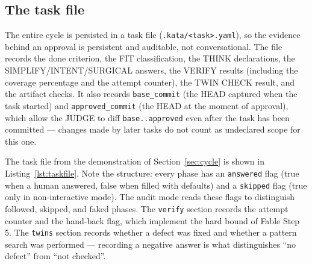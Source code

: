 \documentclass[11pt]{article}
\begin{document}
\subsection{The task file}

The entire cycle is persisted in a task file (\texttt{.kata/<task>.yaml}),
so the evidence behind an approval is persistent and auditable, not
conversational. The file records the done criterion, the FIT classification,
the THINK declarations, the SIMPLIFY/INTENT/SURGICAL answers, the VERIFY
results (including the coverage percentage and the attempt counter), the
TWIN CHECK result, and the artifact checks. It also records
\texttt{base\_commit} (the HEAD captured when the task started) and
\texttt{approved\_commit} (the HEAD at the moment of approval), which allow
the JUDGE to diff \texttt{base..approved} even after the task has been
committed --- changes made by later tasks do not count as undeclared scope
for this one.

The task file from the demonstration of Section~\ref{sec:cycle} is shown
in Listing~\ref{lst:taskfile}. Note the structure: every phase has an
\texttt{answered} flag (true when a human answered, false when filled with
defaults) and a \texttt{skipped} flag (true only in non-interactive mode).
The audit mode reads these flags to distinguish followed, skipped, and
faked phases. The \texttt{verify} section records the attempt counter and
the hand-back flag, which implement the hard bound of Fable Step 5. The
\texttt{twins} section records whether a defect was fixed and whether a
pattern search was performed --- recording a negative answer is what
distinguishes ``no defect'' from ``not checked''.
\end{document}
